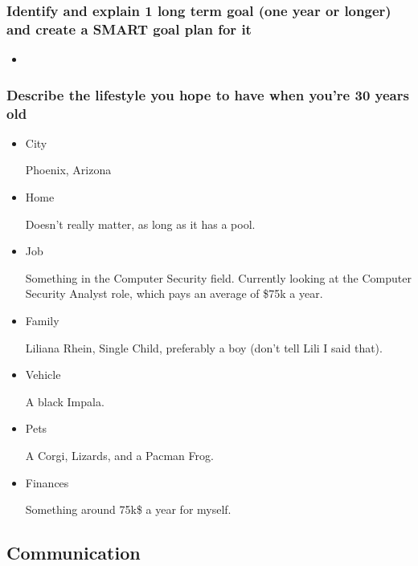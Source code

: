 \documentclass[11pt]{article}
\begin{document}
\subsubsection*{Identify and explain 1 long term goal (one year or longer) and create a SMART goal plan for it}
\label{sec:orge42eebd}
\begin{itemize}
\item 
\label{sec:orgf1816d6}
\end{itemize}
\subsubsection*{Describe the lifestyle you hope to have when you're 30 years old}
\label{sec:org8d5b503}
\begin{itemize}
\item City
\label{sec:org59fa58e}

Phoenix, Arizona

\item Home
\label{sec:org9692501}

Doesn't really matter, as long as it has a pool.

\item Job
\label{sec:orge3bba1b}

Something in the Computer Security field. Currently looking at the Computer Security Analyst role, which pays an average of \$75k a year.

\item Family
\label{sec:orgafad83b}

Liliana Rhein, Single Child, preferably a boy (don't tell Lili I said that).

\item Vehicle
\label{sec:orgfb4d726}

A black Impala.

\item Pets
\label{sec:orgeb87f08}

A Corgi, Lizards, and a Pacman Frog.

\item Finances
\label{sec:orgec2045e}

Something around 75k\$ a year for myself.
\end{itemize}

\subsection*{Communication}
\label{sec:org36ec5dd}
\end{document}
